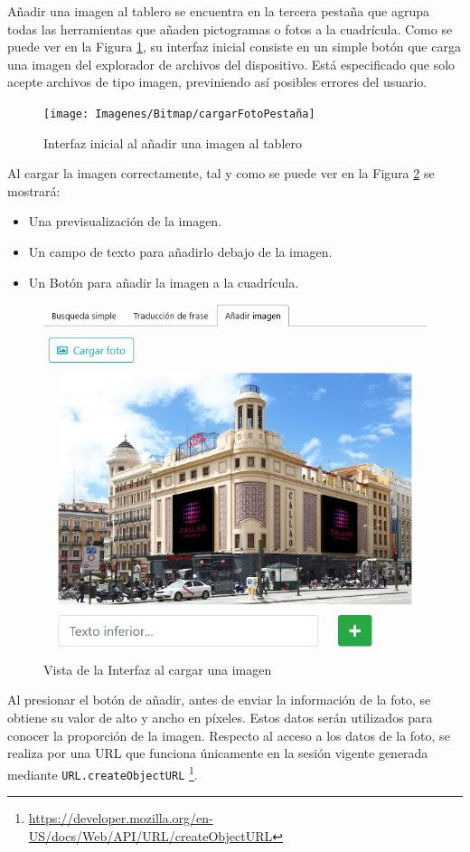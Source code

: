 Añadir una imagen al tablero se encuentra en la tercera pestaña que agrupa todas las herramientas que añaden pictogramas o fotos a la cuadrícula. Como se puede ver en la Figura \ref{fig:cargarfotopestana}, su interfaz inicial consiste en un simple botón que carga una imagen del explorador de archivos del dispositivo. Está especificado que solo acepte archivos de tipo imagen, previniendo así posibles errores del usuario. 

\begin{figure}[h!]
	\centering
	\texttt{[image: Imagenes/Bitmap/cargarFotoPestaña]}
	\caption{Interfaz inicial al añadir una imagen al tablero}
	\label{fig:cargarfotopestana}
\end{figure}


Al cargar la imagen correctamente, tal y como se puede ver en la Figura \ref{fig:addphotoitem} se mostrará: 

\begin{itemize}
	\item Una previsualización de la imagen.
	\item Un campo de texto para añadirlo debajo de la imagen.
	\item Un Botón para añadir la imagen a la cuadrícula.
\end{itemize}

\begin{figure}[h!]
	\centering
	\includegraphics[width=0.7\linewidth]{Imagenes/Bitmap/addPhotoItem}
	\caption{ Vista de la Interfaz al cargar una imagen}
	\label{fig:addphotoitem}
\end{figure}



Al presionar el botón de añadir, antes de enviar la información de la foto, se obtiene su valor de alto y ancho en píxeles. Estos datos serán utilizados para conocer la proporción de la imagen. Respecto al acceso a los datos de la foto, se realiza por una URL que funciona únicamente en la sesión vigente generada mediante \texttt{URL.createObjectURL} \footnote{\url{https://developer.mozilla.org/en-US/docs/Web/API/URL/createObjectURL}}.

